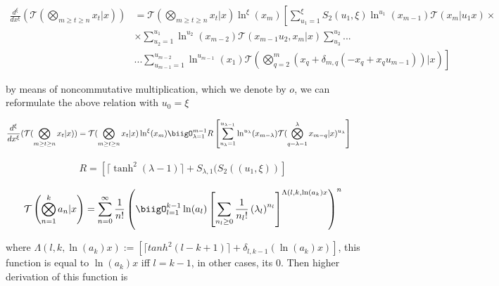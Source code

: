 \begin{theorem}

        \begin{align}
                \frac{d^\xi}{dx^\xi}(\mathcal{T}(\bigotimes_{m \geq t 
                \geq n}x_t | x) ) &= \mathcal{T}(\bigotimes_{m \geq t 
                \geq n}x_t| x) \ln^\xi (x_m) \left[\sum_{u_1 = 1}^\xi 
                S_2(u_1, \xi) \ln^{u_1}(x_{m-1}) \mathcal{T}(x_{m}| u_1  x) 
                \times \right. \\ & \left. \times \sum_{u_2 = 1}^{u_1} 
                \ln^{u_2}(x_{m-2}) \mathcal{T}(x_{m-1} u_2, x_m |x) 
                \sum_{u_3}^{u_2}...\right. \\ & ... \left. \sum_{u_{m-1}
                =1}^{u_{m-2}}\ln^{u_{m-1}}(x_1)\mathcal{T}(\bigotimes_{q=2}^m
                (x_q + \delta_{m, q}(-x_q + x_q u_{m-1})) |x)\right]
        \end{align}

        by means of noncommutative multiplication, which we denote by 
        \(o\), we can reformulate the above relation with \(u_0 = \xi\)
        
        \begin{align}
                \frac{d^\xi}{dx^\xi}(\mathcal{T}(\bigotimes_{m \geq t \geq n}x_t | x) ) 
                &= \mathcal{T}(\bigotimes_{m \geq t \geq n}x_t| x) \ln^\xi (x_m) 
                \biigO_{\lambda = 1}^{m-1} R\left[\sum_{u_{\lambda}=1}^{u_{\lambda-1}}
                \ln^{u_{\lambda}}(x_{m-\lambda}) \mathcal{T}(\bigotimes_{q = \lambda-1}^\lambda
                x_{m-q} |x)^{u_{\lambda}} \right]
        \label{w}
        \end{align}
        
        \begin{align}
                R=\left[ \lceil \tanh^2(\lambda -1)\rceil+S_{\lambda, 1}(S_2((u_1, \xi))\right]
        \end{align}
        
\end{theorem}

\begin{align}
 \mathcal{T}\left(\bigotimes_{n=1}^ka_n | x\right) = \sum_{n=0}^\infty 
 \frac{1}{n!}\left(\biigO_{l=1}^{k-1}\ln(a_l)\left[\sum_{n_l\geq0}\frac{1}
 {n_l!}\left(\lambda_l\right)^{n_l}\right]^{\Lambda(l, k, \ln(a_k)x}\right)^n
\end{align}

where \(\Lambda(l, k, \ln(a_k)x) :=\left[\lceil tanh^2(l-k+1)\rceil+
\delta_{l, k-1}(\ln(a_k)x)\right]\), this function is equal to \(\ln(a_k)x\)
iff \(l=k-1\), in other cases, its 0. Then higher derivation of this function is

